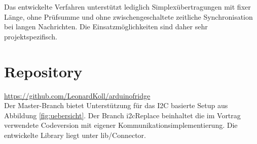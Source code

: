 \documentclass[a4paper, 11pt]{article}
\begin{document}
Das entwickelte Verfahren unterstützt lediglich Simplexübertragungen mit fixer Länge, ohne Prüfsumme und ohne zwischengeschaltete zeitliche Synchronisation bei langen Nachrichten. Die Einsatzmöglichkeiten sind daher sehr projektspezifisch.

\section{Repository}
\url{https://github.com/LeonardKoll/arduinofridge}\\
Der Master-Branch bietet Unterstützung für das I2C basierte Setup aus Abbildung \ref{fig:uebersicht}. Der Branch i2cReplace beinhaltet die im Vortrag verwendete Codeversion mit eigener Kommunikationsimplementierung. Die entwickelte Library liegt unter lib/Connector.
\end{document}
